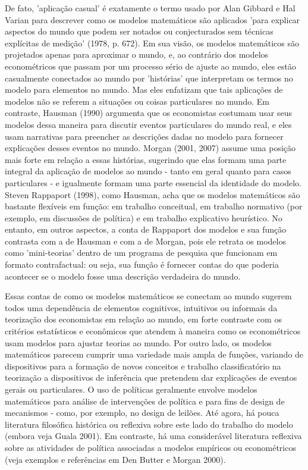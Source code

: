 \documentclass[a4paper,12pt]{article}[abntex2]
\begin{document}
De fato, 'aplicação casual' é exatamente o termo usado por Alan Gibbard e Hal Varian para descrever como os modelos matemáticos são aplicados 'para explicar aspectos do mundo que podem ser notados ou conjecturados sem técnicas explícitas de medição' (1978, p. 672). Em sua visão, os modelos matemáticos são projetados apenas para aproximar o mundo, e, ao contrário dos modelos econométricos que passam por um processo sério de ajuste ao mundo, eles estão casualmente conectados ao mundo por 'histórias' que interpretam os termos no modelo para elementos no mundo. Mas eles enfatizam que tais aplicações de modelos não se referem a situações ou coisas particulares no mundo. Em contraste, Hausman (1990) argumenta que os economistas costumam usar seus modelos dessa maneira para discutir eventos particulares do mundo real, e eles usam narrativas para preencher as descrições dadas no modelo para fornecer explicações desses eventos no mundo. Morgan (2001, 2007) assume uma posição mais forte em relação a essas histórias, sugerindo que elas formam uma parte integral da aplicação de modelos ao mundo - tanto em geral quanto para casos particulares - e igualmente formam uma parte essencial da identidade do modelo. Steven Rappaport (1998), como Hausman, acha que os modelos matemáticos são bastante flexíveis em função: em trabalho conceitual, em trabalho normativo (por exemplo, em discussões de política) e em trabalho explicativo heurístico. No entanto, em outros aspectos, a conta de Rappaport dos modelos e sua função contrasta com a de Hausman e com a de Morgan, pois ele retrata os modelos como 'mini-teorias' dentro de um programa de pesquisa que funcionam em formato contrafactual: ou seja, sua função é fornecer contas do que poderia acontecer se o modelo fosse uma descrição verdadeira do mundo.

Essas contas de como os modelos matemáticos se conectam ao mundo sugerem todos uma dependência de elementos cognitivos, intuitivos ou informais da teorização dos economistas em relação ao mundo, em forte contraste com os critérios estatísticos e econômicos que atendem à maneira como os econométricos usam modelos para ajustar teorias ao mundo. Por outro lado, os modelos matemáticos parecem cumprir uma variedade mais ampla de funções, variando de dispositivos para a formação de novos conceitos e trabalho classificatório na teorização a dispositivos de inferência que pretendem dar explicações de eventos gerais ou particulares. O uso de políticas geralmente envolve modelos matemáticos para análise de intervenções de política e para fins de design de mecanismos - como, por exemplo, no design de leilões. Até agora, há pouca literatura filosófica histórica ou reflexiva sobre este lado do trabalho do modelo (embora veja Guala 2001). Em contraste, há uma considerável literatura reflexiva sobre as atividades de política associadas a modelos empíricos ou econométricos (veja exemplos e referências em Den Butter e Morgan 2000).
\end{document}
